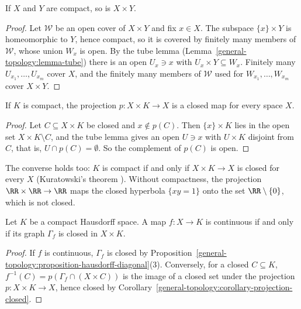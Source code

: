 \begin{proposition}\label{general-topology:proposition-finite-products}
If $X$ and $Y$ are compact, so is $X \times Y$.
\end{proposition}

\begin{proof}
Let $\mathcal{W}$ be an open cover of $X \times Y$ and fix $x \in X$. The subspace $\{x\} \times Y$ is homeomorphic to $Y$, hence compact, so it is covered by finitely many members of $\mathcal{W}$, whose union $W_x$ is open. By the tube lemma
(Lemma~\ref{general-topology:lemma-tube}) there is an open $U_x \ni x$ with $U_x \times Y \subseteq W_x$. Finitely many $U_{x_1}, \ldots, U_{x_m}$ cover $X$, and the finitely many members of $\mathcal{W}$ used for $W_{x_1}, \ldots, W_{x_m}$ cover
$X \times Y$.
\end{proof}

\begin{corollary}\label{general-topology:corollary-projection-closed}
If $K$ is compact, the projection $p \colon X \times K \to X$ is a closed map for every space $X$.
\end{corollary}

\begin{proof}
Let $C \subseteq X \times K$ be closed and $x \notin p(C)$. Then $\{x\} \times K$ lies in the open set $X \times K \setminus C$, and the tube lemma gives an open $U \ni x$ with $U \times K$ disjoint from $C$, that is, $U \cap p(C) = \emptyset$. So the
complement of $p(C)$ is open.
\end{proof}

The converse holds too: $K$ is compact if and only if $X \times K \to X$ is closed for every $X$ (Kuratowski's theorem \cite{engelking-general-topology}). Without compactness, the projection $\RR \times \RR \to \RR$ maps the closed hyperbola
$\{xy = 1\}$ onto the set $\RR \setminus \{0\}$, which is not closed.

\begin{proposition}\label{general-topology:proposition-closed-graph}
Let $K$ be a compact Hausdorff space. A map $f \colon X \to K$ is continuous if and only if its graph $\Gamma_f$ is closed in $X \times K$.
\end{proposition}

\begin{proof}
If $f$ is continuous, $\Gamma_f$ is closed by Proposition~\ref{general-topology:proposition-hausdorff-diagonal}(3). Conversely, for a closed $C \subseteq K$, $f^{-1}(C) = p(\Gamma_f \cap (X \times C))$ is the image of a closed set under the
projection $p \colon X \times K \to X$, hence closed by Corollary~\ref{general-topology:corollary-projection-closed}.
\end{proof}

